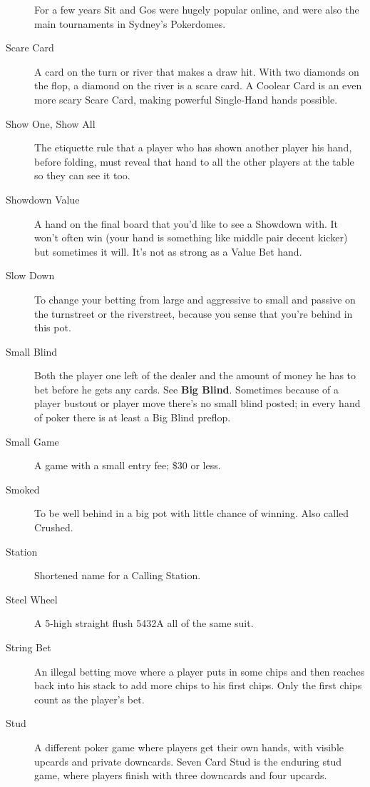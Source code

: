 \begin{description}
For a few years Sit and Gos were hugely popular online, and were also
the main tournaments in Sydney's Pokerdomes.

\item[Scare Card] A card on the turn or river that makes a draw hit.
With two diamonds on the flop, a diamond on the river is a scare card.
A Coolear Card is an even more scary Scare Card, making powerful
Single-Hand hands possible.

\item[Show One, Show All] The etiquette rule that a player who has
shown another player his hand, before folding, must reveal that hand
to all the other players at the table so they can see it too.

\item[Showdown Value] A hand on the final board that you'd like to see
a Showdown with. It won't often win (your hand is something like
middle pair decent kicker) but sometimes it will. It's not as strong
as a Value Bet hand.

\item[Slow Down] To change your betting from large and aggressive
to small and passive on the turnstreet or the riverstreet, because
you sense that you're behind in this pot.

\item[Small Blind] Both the player one left of the dealer and the
amount of money he has to bet before he gets any cards. See
\textbf{Big Blind}. Sometimes because of a player bustout or player
move there's no small blind posted; in every hand of poker there is at
least a Big Blind preflop.

\item[Small Game] A game with a small entry fee; \$30 or less.

\item[Smoked] To be well behind in a big pot with little chance of
winning. Also called Crushed.

\item[Station] Shortened name for a Calling Station.

\item[Steel Wheel] A 5-high straight flush 5432A all of the same suit.

\item[String Bet] An illegal betting move where a player puts in some
chips and then reaches back into his stack to add more chips to his
first chips. Only the first chips count as the player's bet.

\item[Stud] A different poker game where players get their own hands,
with visible upcards and private downcards. Seven Card Stud is the
enduring stud game, where players finish with three downcards and four
upcards.


\end{description}
